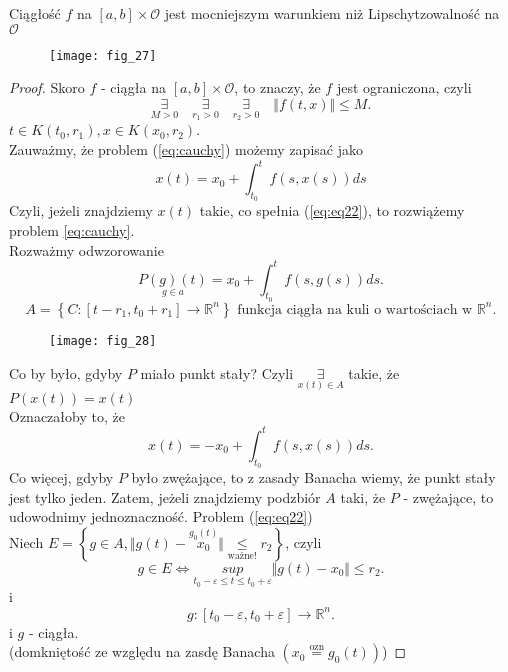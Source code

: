 \documentclass[../main.tex]{subfiles}
\begin{document}
        \begin{uwaga}
            Ciągłość $f$ na $[a,b]\times\mathcal{O}$ jest mocniejszym warunkiem niż Lipschytzowalność na $\mathcal{O}$
        \end{uwaga}

        \begin{figure}[h]
            \centering
            \texttt{[image: fig\_27]}
            \caption{}
            \label{fig:fig_27}
        \end{figure}

        \begin{proof}
            Skoro $f$ - ciągła na $[a,b]\times\mathcal{O}$, to znaczy, że $f$ jest ograniczona, czyli
            \[
                \underset{M>0}{\exists}\quad \underset{r_1>0}{\exists}\quad \underset{r_2>0}{\exists}\quad \Vert f(t,x) \Vert \leq M
            .\]
            $t\in K(t_0,r_1), x\in K(x_0,r_2)$.\\
            Zauważmy, że problem (\ref{eq:cauchy}) możemy zapisać jako
            \begin{equation}\label{eq:eq22}
                x(t) = x_0 + \int_{t_0}^t f(s,x(s)) ds
            \end{equation}
            Czyli, jeżeli znajdziemy $x(t)$ takie, co spełnia (\ref{eq:eq22}), to rozwiążemy problem \ref{eq:cauchy}.\\
            Rozważmy odwzorowanie \[
                \underset{g\in a}{P(g)(t)} = x_0 + \int_{t_0}^t f(s,g(s))ds
            .\]
            \[
                A = \left\{ C: [t-r_1, t_0+r_1]\to \mathbb{R}^n \right\}\text{ funkcja ciągła na kuli o wartościach w }\mathbb{R}^n
            .\]
            \begin{figure}[h]
                \centering
                \texttt{[image: fig\_28]}
                \caption{}
                \label{fig:fig_28}
            \end{figure}
            Co by było, gdyby $P$ miało punkt stały?
            Czyli $\underset{x(t)\in A}{\exists}$ takie, że $P(x(t)) = x(t)$\\
            Oznaczałoby to, że \[
                x(t) = -x_0 + \int_{t_0}^t f(s,x(s))ds
            .\] Co więcej, gdyby $P$ było zwężające, to z zasady Banacha wiemy, że punkt stały jest tylko jeden. Zatem, jeżeli znajdziemy podzbiór $A$ taki, że $P$ - zwężające, to udowodnimy jednoznaczność. Problem (\ref{eq:eq22})\\
            Niech $E = \left\{ g\in A, \Vert g(t) - \overset{g_0(t)}{x_0} \Vert \underset{\text{ważne!}}{\leq} r_2 \right\} $, czyli \[
                g\in E \iff \underset{t_0-\varepsilon\leq t\leq t_0+\varepsilon}{sup} \Vert g(t) - x_0 \Vert \leq r_2
            .\] i \[
            g: [t_0-\varepsilon, t_0+\varepsilon]\to\mathbb{R}^n
            .\] i $g$ - ciągła.\\
            (domkniętość ze względu na zasdę Banacha $(x_0 \overset{\text{ozn}}{=} g_0(t) )$)


\end{proof}
\end{document}
